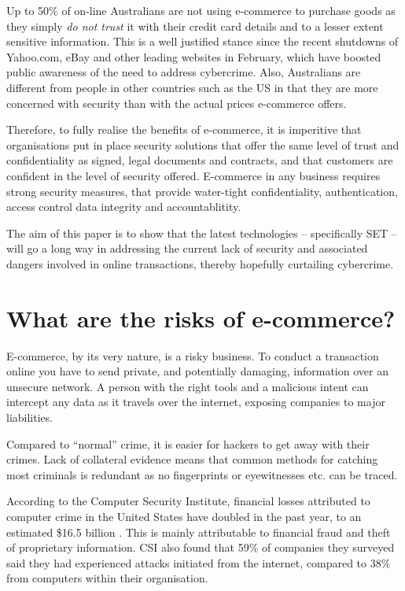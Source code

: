 \documentclass[11pt,a4paper,twoside,notitlepage]{article}
\begin{document}
Up to 50\% of on-line Australians are not using e-commerce to purchase goods as they simply 
\textit{do not trust} it with their credit card details and to a lesser extent sensitive information\cite{anon:ABF00}.  This is a well justified stance since the
recent shutdowns of Yahoo.com, eBay and other leading websites in February, which have boosted public
awareness of the need to address cybercrime. Also,  Australians are different from people in other countries such as the US in that
they are more concerned with security than with the actual prices e-commerce
offers\cite{anon:ABF00}.


Therefore, to fully realise the benefits of e-commerce, it is imperitive that organisations put in place
security solutions that offer the same level of trust and confidentiality as signed, legal documents and 
contracts, and that customers are confident in the level of security offered.  E-commerce in any business
requires strong security measures, that provide water-tight confidentiality, authentication, access control
data integrity and accountablitity.

The aim of this paper is to show that the latest technologies -- specifically SET
-- will go a long way in addressing the current lack of security and associated dangers involved
in online transactions, 
thereby hopefully curtailing cybercrime.

\section*{What are the risks of e-commerce?}

 E-commerce, by its very nature, is a risky business.  To conduct a transaction online
 you have to send private, and potentially damaging, information over an unsecure
 network.  A person with the right tools and a malicious intent can intercept any
 data as it travels over the internet, exposing companies to major liabilities.  

 Compared to ``normal'' crime, it is easier for hackers to get away with their crimes.
 Lack of collateral evidence means that common methods for catching most criminals is 
 redundant as no fingerprints or eyewitnesses etc. can be traced\cite{Phillips:Age99}.

 According to the Computer Security Institute, financial losses attributed to computer
 crime in the United States have doubled in the past year, to an estimated
 \$16.5 billion \cite{anonLA:Age00}.  This is mainly attributable to financial
 fraud and theft of proprietary information.  CSI also found that 59\% of companies
 they surveyed said they had experienced attacks initiated from the internet, compared
 to 38\% from computers within their organisation\cite{anonLA:Age00}.
 
\end{document}
